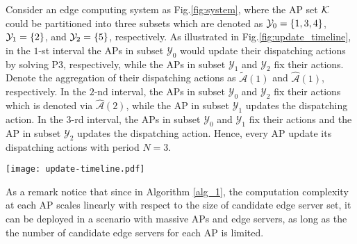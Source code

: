 \begin{example}
    \label{exp:update}
    Consider an edge computing system as Fig.\ref{fig:system}, where the AP set $\mathcal{K}$ could be partitioned into three subsets which are denoted as $\mathcal{Y}_{0} = \{1,3,4\}$, $\mathcal{Y}_{1} = \{2\}$, and $\mathcal{Y}_{2} = \{5\}$, respectively.
    As illustrated in Fig.\ref{fig:update_timeline}, in the $1$-st interval the APs in subset $\mathcal{Y}_{0}$ would update their dispatching actions by solving P3, respectively, while the APs in subset $\mathcal{Y}_{1}$ and $\mathcal{Y}_{2}$ fix their actions.
    Denote the aggregation of their dispatching actions as $\tilde{\mathcal{A}}(1)$ and $\hat{\mathcal{A}}(1)$, respectively.
    In the $2$-nd interval, the APs in subset $\mathcal{Y}_{0}$ and $\mathcal{Y}_{2}$ fix their actions which is denoted via $\hat{\mathcal{A}}(2)$, while 
    the AP in subset $\mathcal{Y}_{1}$ updates the dispatching action. %
    In the $3$-rd interval, the APs in subset $\mathcal{Y}_{0}$ and $\mathcal{Y}_{1}$ fix their actions and the AP in subset $\mathcal{Y}_{2}$ updates the dispatching action.
    Hence, every AP update its dispatching actions with period $N=3$.
    \begin{figure*}[htp!]
        \centering
        \texttt{[image: update-timeline.pdf]}
        \caption{The Illustration of Example \ref{exp:update}.}
        \label{fig:update_timeline}
    \end{figure*}
\end{example}

As a remark notice that since in Algorithm \ref{alg_1}, the computation complexity at each AP scales linearly with respect to {the size of candidate edge server set}, it can be deployed in a scenario with massive APs and edge servers, as long as the {the number of candidate edge servers for each AP} is limited.

